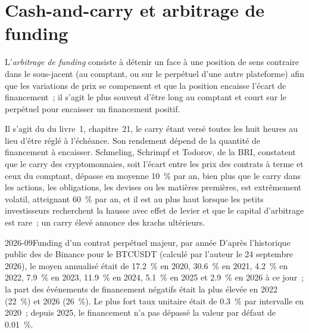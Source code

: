 \section{Cash-and-carry et arbitrage de funding}

\begin{definition}\label{def:m3:perpetual-futures:funding-arb}
L'\emph{arbitrage de funding} consiste à détenir un  face à une position de sens contraire dans
le sous-jacent (au comptant, ou sur le perpétuel d'une autre plateforme) afin que les variations de prix se compensent et que la position encaisse l'écart de
financement~; il s'agit le plus souvent d'être long au comptant et court sur le perpétuel pour encaisser un financement positif.
\end{definition}

Il s'agit du  du livre~1, chapitre~21, le carry étant versé toutes les huit heures au lieu d'être
réglé à l'échéance. Son rendement dépend de la quantité de financement à encaisser. Schmeling, Schrimpf et Todorov, de la BRI, constatent
que le carry des cryptomonnaies, soit l'écart entre les prix des contrats à terme et ceux du comptant, dépasse en moyenne 10~\% par an, bien plus que le carry
dans les actions, les obligations, les devises ou les matières premières, est extrêmement volatil, atteignant 60~\% par an, et il est au plus haut lorsque les petits
investisseurs recherchent la hausse avec effet de levier et que le capital d'arbitrage est rare~; un carry élevé annonce des krachs ultérieurs.

\begin{dated}{2026-09}{Funding d'un contrat perpétuel majeur, par année}\label{dat:m3:perpetual-futures:years}
D'après l'historique public des  de Binance pour le  BTCUSDT (calculé par l'auteur le 24 septembre 2026), le
 moyen annualisé était de 17.2~\% en 2020, 30.6~\% en 2021, 4.2~\% en 2022, 7.9~\% en 2023, 11.9~\% en 2024, 5.1~\%
en 2025 et 2.9~\% en 2026 à ce jour~; la part des événements de financement négatifs était la plus élevée en 2022 (22~\%) et 2026 (26~\%).
Le plus fort taux unitaire était de 0.3~\% par intervalle en 2020~; depuis 2025, le financement n'a pas dépassé la valeur par défaut de 0.01~\%.
\end{dated}

